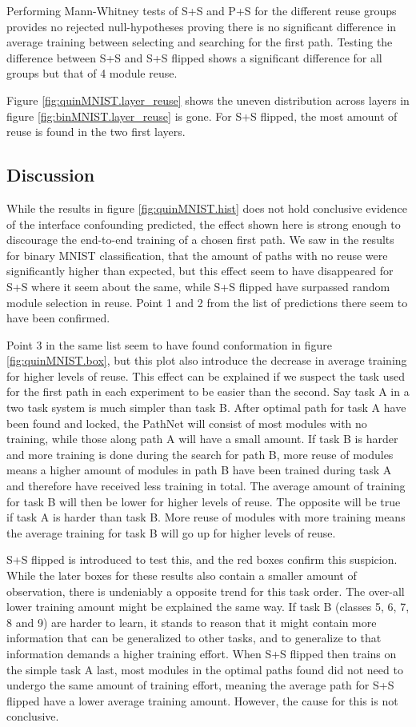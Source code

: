 Performing Mann-Whitney tests of S+S and P+S for the different reuse groups provides no rejected null-hypotheses proving there is no significant difference in average training between selecting and searching for the first path. Testing the difference between S+S and S+S flipped shows a significant difference for all groups but that of 4 module reuse. 

Figure \ref{fig:quinMNIST.layer_reuse} shows the uneven distribution across layers in figure \ref{fig:binMNIST.layer_reuse} is gone. For S+S flipped, the most amount of reuse is found in the two first layers.

\subsection{Discussion}
While the results in figure \ref{fig:quinMNIST.hist} does not hold conclusive evidence of the interface confounding predicted, the effect shown here is strong enough to discourage the end-to-end training of a chosen first path. We saw in the results for binary MNIST classification, that the amount of paths with no reuse were significantly higher than expected, but this effect seem to have disappeared for S+S where it seem about the same, while S+S flipped have surpassed random module selection in reuse. Point 1 and 2 from the list of predictions there seem to have been confirmed. 

Point 3 in the same list seem to have found conformation in figure \ref{fig:quinMNIST.box}, but this plot also introduce the decrease in average training for higher levels of reuse. This effect can be explained if we suspect the task used for the first path in each experiment to be easier than the second. Say task A in a two task system is much simpler than task B. After optimal path for task A have been found and locked, the PathNet will consist of most modules with no training, while those along path A will have a small amount. If task B is harder and more training is done during the search for path B, more reuse of modules means a higher amount of modules in path B have been trained during task A and therefore have received less training in total. The average amount of training for task B will then be lower for higher levels of reuse. 
The opposite will be true if task A is harder than task B. More reuse of modules with more training means the average training for task B will go up for higher levels of reuse. 

S+S flipped is introduced to test this, and the red boxes confirm this suspicion. While the later boxes for these results also contain a smaller amount of observation, there is undeniably a opposite trend for this task order. The over-all lower training amount might be explained the same way. If task B (classes 5, 6, 7, 8 and 9) are harder to learn, it stands to reason that it might contain more information that can be generalized to other tasks, and to generalize to that information demands a higher training effort. When S+S flipped then trains on the simple task A last, most modules in the optimal paths found did not need to undergo the same amount of training effort, meaning the average path for S+S flipped have a lower average training amount. However, the cause for this is not conclusive. 


